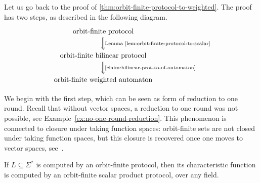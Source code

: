 Let us go back to the proof of \cref{thm:orbit-finite-protocol-to-weighted}. The proof has two steps, as described in the following diagram.
\[
\begin{tikzcd}
\text{orbit-finite protocol}
\ar[d,Rightarrow,"\text{Lemma~\ref{lem:orbit-finite-protocol-to-scalar}}"]
\\
\text{orbit-finite bilinear protocol}
\ar[d,Rightarrow, "\text{\cref{claim:bilinear-prot-to-of-automaton}}"]
\\
\text{orbit-finite weighted automaton}
\end{tikzcd}
\]

We begin with the first step, which can be seen as form of reduction to one round. Recall that without vector spaces, a reduction to one round was not possible, see Example~\ref{ex:no-one-round-reduction}. This phenomenon is connected to closure under taking function spaces: orbit-finite sets are not closed under taking function spaces, but this closure is recovered once one moves to vector spaces, see~\cite[Section 8.3]{bojanczyk_slightly}. 

\begin{lemma}\label{lem:orbit-finite-protocol-to-scalar}
    If $L \subseteq \Sigma^*$ is computed by an orbit-finite protocol, then its characteristic function is computed by an orbit-finite scalar product protocol, over any field.
\end{lemma}



